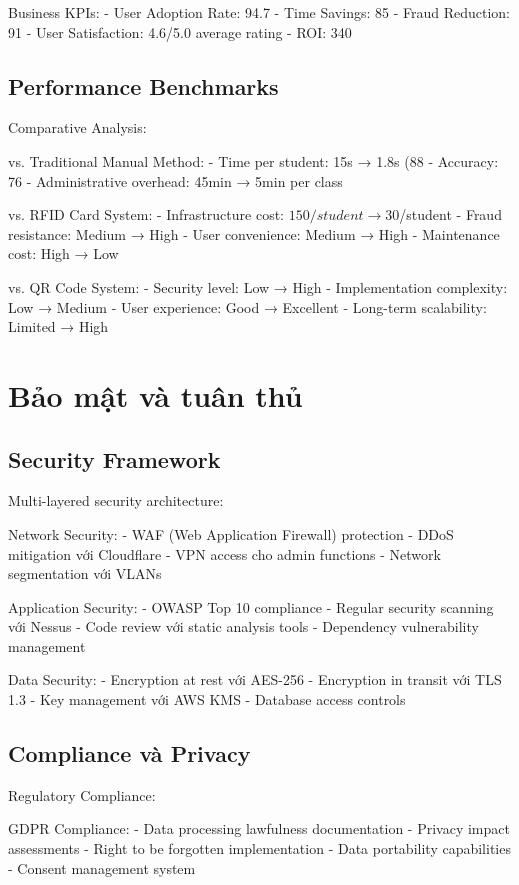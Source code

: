 \documentclass[12pt,a4paper]{report}
\begin{document}
Business KPIs:
- User Adoption Rate: 94.7%
- Time Savings: 85%
- Fraud Reduction: 91%
- User Satisfaction: 4.6/5.0 average rating
- ROI: 340%

\subsection{Performance Benchmarks}
Comparative Analysis:

vs. Traditional Manual Method:
- Time per student: 15s → 1.8s (88%
- Accuracy: 76%
- Administrative overhead: 45min → 5min per class

vs. RFID Card System:
- Infrastructure cost: $150/student → $30/student
- Fraud resistance: Medium → High
- User convenience: Medium → High
- Maintenance cost: High → Low

vs. QR Code System:
- Security level: Low → High
- Implementation complexity: Low → Medium
- User experience: Good → Excellent
- Long-term scalability: Limited → High

\section{Bảo mật và tuân thủ}
\subsection{Security Framework}
Multi-layered security architecture:

Network Security:
- WAF (Web Application Firewall) protection
- DDoS mitigation với Cloudflare
- VPN access cho admin functions
- Network segmentation với VLANs

Application Security:
- OWASP Top 10 compliance
- Regular security scanning với Nessus
- Code review với static analysis tools
- Dependency vulnerability management

Data Security:
- Encryption at rest với AES-256
- Encryption in transit với TLS 1.3
- Key management với AWS KMS
- Database access controls

\subsection{Compliance và Privacy}
Regulatory Compliance:

GDPR Compliance:
- Data processing lawfulness documentation
- Privacy impact assessments
- Right to be forgotten implementation
- Data portability capabilities
- Consent management system
\end{document}
